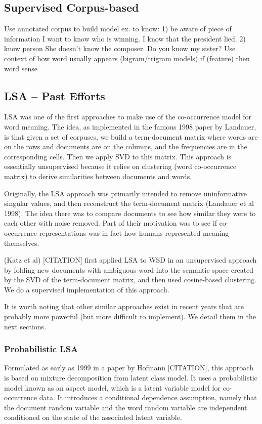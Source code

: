 \documentclass[10pt, letterpaper]{article}
\begin{document}
	\subsection{Supervised Corpus-based}
	 Use annotated corpus to build model
 	 ex. to know: 1) be aware of piece of information
                              I want to know who is winning.
                              I know that the president lied.
                             2) know person
                             She doesn't know the composer.
                             Do you know my sister?
	 Use context of how word usually appears (bigram/trigram models)
 	 if (feature) then word sense
 	\subsection{LSA -- Past Efforts}
 	LSA was one of the first approaches to make use of the co-occurrence model for word meaning. The idea, as implemented in the famous 1998 paper by Landauer, is that given a set of corpuses, we build a term-document matrix where words are on the rows and documents are on the columns, and the frequencies are in the corresponding cells.
	Then we apply SVD to this matrix. 
	This approach is essentially unsupervised because it relies on clustering (word co-occurrence matrix) to derive similarities between documents and words. 

	Originally, the LSA approach was primarily intended to remove uninformative singular values, and then reconstruct the term-document matrix (Landauer et al 1998).  The idea there was to compare documents to see how similar they were to each other with noise removed. Part of their motivation was to see if co-occurrence representations was in fact how humans represented meaning themselves.

	(Katz et al) [CITATION] first applied LSA to WSD in an unsupervised approach by folding new documents with ambiguous word into the semantic space created by the SVD of the term-document matrix, and then used cosine-based clustering. We do a supervised implementation of this approach. 

	It is worth noting that other similar approaches exist in recent years that are probably more powerful (but more difficult to implement). We detail them in the next sections. 

	\subsubsection{Probabilistic LSA}
	Formulated as early as 1999 in a paper by Hofmann [CITATION], this approach is based on mixture decomposition from latent class model. It uses a probabilistic model known as an aspect model, which is a latent variable model for co-occurrence data. It introduces a conditional dependence assumption, namely that the document random variable and the word random variable are independent conditioned on the state of the associated latent variable. 
	
\end{document}
